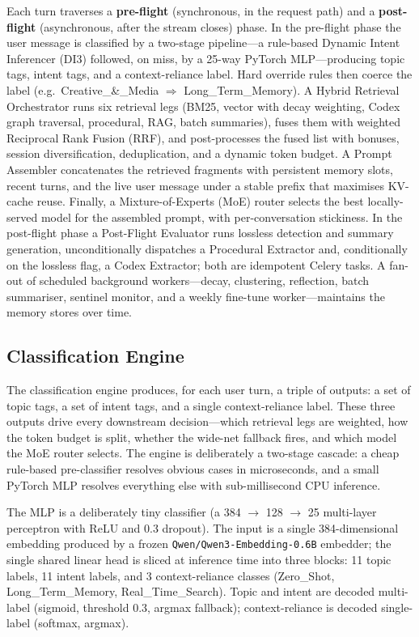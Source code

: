 \documentclass[11pt,a4paper]{article}
\begin{document}
Each turn traverses a \textbf{pre-flight} (synchronous, in the request path) and a \textbf{post-flight} (asynchronous, after the stream closes) phase. In the pre-flight phase the user message is classified by a two-stage pipeline---a rule-based Dynamic Intent Inferencer (DI3) followed, on miss, by a 25-way PyTorch MLP---producing topic tags, intent tags, and a context-reliance label. Hard override rules then coerce the label (e.g.\ Creative\_\&\_Media $\Rightarrow$ Long\_Term\_Memory). A Hybrid Retrieval Orchestrator runs six retrieval legs (BM25, vector with decay weighting, Codex graph traversal, procedural, RAG, batch summaries), fuses them with weighted Reciprocal Rank Fusion (RRF), and post-processes the fused list with bonuses, session diversification, deduplication, and a dynamic token budget. A Prompt Assembler concatenates the retrieved fragments with persistent memory slots, recent turns, and the live user message under a stable prefix that maximises KV-cache reuse. Finally, a Mixture-of-Experts (MoE) router selects the best locally-served model for the assembled prompt, with per-conversation stickiness. In the post-flight phase a Post-Flight Evaluator runs lossless detection and summary generation, unconditionally dispatches a Procedural Extractor and, conditionally on the lossless flag, a Codex Extractor; both are idempotent Celery tasks. A fan-out of scheduled background workers---decay, clustering, reflection, batch summariser, sentinel monitor, and a weekly fine-tune worker---maintains the memory stores over time.

\subsection{Classification Engine}

The classification engine produces, for each user turn, a triple of outputs: a set of topic tags, a set of intent tags, and a single context-reliance label. These three outputs drive every downstream decision---which retrieval legs are weighted, how the token budget is split, whether the wide-net fallback fires, and which model the MoE router selects. The engine is deliberately a two-stage cascade: a cheap rule-based pre-classifier resolves obvious cases in microseconds, and a small PyTorch MLP resolves everything else with sub-millisecond CPU inference.

The MLP is a deliberately tiny classifier (a 384 $\rightarrow$ 128 $\rightarrow$ 25 multi-layer perceptron with ReLU and 0.3 dropout). The input is a single 384-dimensional embedding produced by a frozen \texttt{Qwen/Qwen3-Embedding-0.6B} embedder; the single shared linear head is sliced at inference time into three blocks: 11 topic labels, 11 intent labels, and 3 context-reliance classes (Zero\_Shot, Long\_Term\_Memory, Real\_Time\_Search). Topic and intent are decoded multi-label (sigmoid, threshold 0.3, argmax fallback); context-reliance is decoded single-label (softmax, argmax).
\end{document}
